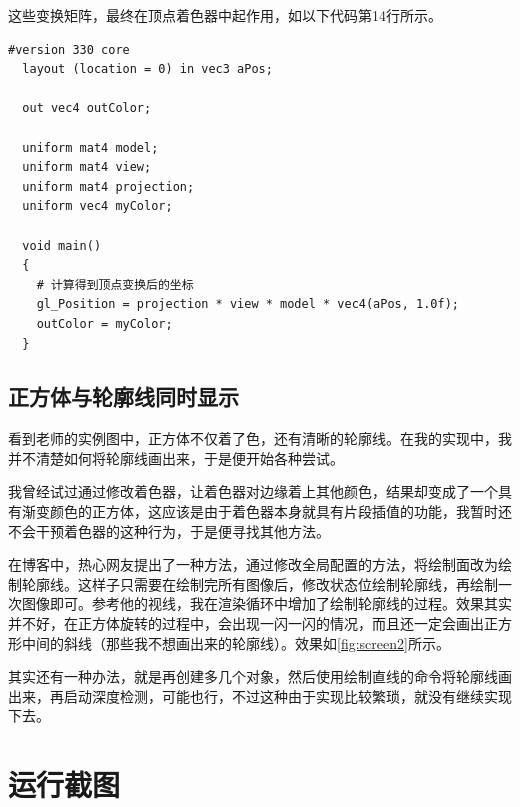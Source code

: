 \documentclass[forprint]{myreport}
\begin{document}
这些变换矩阵，最终在顶点着色器中起作用，如以下代码第14行所示。

\begin{lstlisting}[style = c]
  #version 330 core
  layout (location = 0) in vec3 aPos;
  
  out vec4 outColor;
  
  uniform mat4 model;
  uniform mat4 view;
  uniform mat4 projection;
  uniform vec4 myColor;
  
  void main()
  {
    # 计算得到顶点变换后的坐标
    gl_Position = projection * view * model * vec4(aPos, 1.0f);
    outColor = myColor;	
  }
\end{lstlisting}

\subsection{正方体与轮廓线同时显示}

看到老师的实例图中，正方体不仅着了色，还有清晰的轮廓线。在我的实现中，我并不清楚如何将轮廓线画出来，于是便开始各种尝试。

我曾经试过通过修改着色器，让着色器对边缘着上其他颜色，结果却变成了一个具有渐变颜色的正方体，这应该是由于着色器本身就具有片段插值的功能，我暂时还不会干预着色器的这种行为，于是便寻找其他方法。

在博客\cite{r2}中，热心网友提出了一种方法，通过修改全局配置的方法，将绘制面改为绘制轮廓线。这样子只需要在绘制完所有图像后，修改状态位绘制轮廓线，再绘制一次图像即可。参考他的视线，我在渲染循环中增加了绘制轮廓线的过程。效果其实并不好，在正方体旋转的过程中，会出现一闪一闪的情况，而且还一定会画出正方形中间的斜线（那些我不想画出来的轮廓线）。效果如\autoref{fig:screen2}所示。


其实还有一种办法，就是再创建多几个对象，然后使用绘制直线的命令将轮廓线画出来，再启动深度检测，可能也行，不过这种由于实现比较繁琐，就没有继续实现下去。

\section{运行截图}
\end{document}
